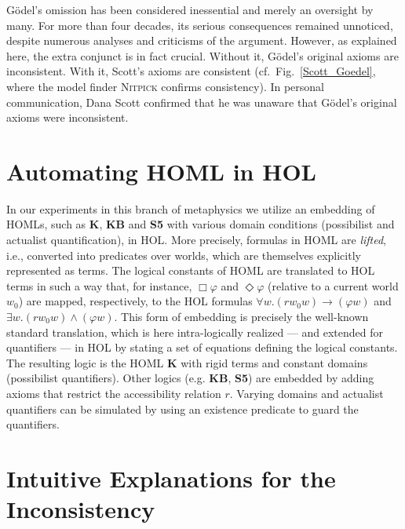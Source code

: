 \documentclass{llncs}
\newcommand{\imp}{{\rightarrow}}
\begin{document}
G\"odel's omission has been
considered inessential and merely an oversight by many. 
For more than four decades, its serious consequences remained unnoticed, 
despite numerous analyses and criticisms of the
argument.
However, as explained here, the extra conjunct is in
fact crucial. Without it, G\"odel's original axioms are
inconsistent. With it, Scott's axioms are consistent (cf.~Fig.~\ref{Scott_Goedel},
where the model finder \textsc{Nitpick} \cite{Nitpick} confirms consistency). In
personal communication, Dana Scott confirmed that he was unaware
that G\"odel's original axioms were inconsistent.









\section{Automating HOML in HOL}\label{sec:homlinhol}



In our experiments in this branch of metaphysics we
utilize an embedding of HOMLs, such as \textbf{K}, \textbf{KB} and
\textbf{S5} with various domain conditions (possibilist and actualist
quantification), in HOL. More precisely, formulas in HOML are \emph{lifted}, i.e., converted
into predicates over worlds, which are themselves explicitly
represented as terms. The logical constants of HOML are translated to
HOL terms in such a way that, for instance,
$\Box \varphi$ and $\Diamond \varphi$ (relative to a current world
$w_0$) are mapped, respectively, to the HOL formulas
$\forall w. (r w_0 w) \imp (\varphi w)$ and
$\exists w. (r w_0 w) \wedge (\varphi w)$. This form of embedding is
precisely the well-known standard translation,
which is here intra-logically realized --- and extended for
quantifiers --- in HOL by stating a set of equations defining the
logical constants. The resulting logic is
the HOML \textbf{K} with rigid terms and constant domains (possibilist
quantifiers). Other logics (e.g. \textbf{KB}, \textbf{S5}) are
embedded by adding axioms that restrict the accessibility relation
$r$. Varying domains and actualist quantifiers can be simulated by
using an existence predicate to guard the quantifiers. 



\section{Intuitive Explanations for the Inconsistency} 
\label{sec:inconsistency}
\end{document}
